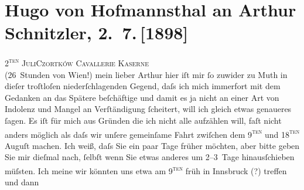 

               \section[Hugo von Hofmannsthal an Arthur Schnitzler, 2. 7. {[}1898{]}]{ Hugo von Hofmannsthal an Arthur Schnitzler, 2. 7. {[}1898{]}}\nopagebreak{}\rehead{ }\begin{ledgroupsized}[t]{13cm}\normalsize\beginnumbering{} \toendnotes[C]{\smallbreak\pagebreak[2]} 
\pstart
           {\pb}\textsc{2\textsuperscript{ten} Juli}\hfill \textsc{Czortków}\pend
           \pstart
           \raggedleft{}\textsc{Cavallerie Kaserne}{\\} (26 Stunden von Wien!)\pend
           \pstart{}mein lieber Arthur\pend\pstart
           hier iſt mir ſo zuwider zu Muth in dieſer troſtloſen niederſchlagenden Gegend,
                    daſs ich mich immerfort mit dem Gedanken an das Spätere beſchäftige und damit es
                    ja nicht an einer Art von Indolenz und Mangel an Verſtändigung ſcheitert, will
                    ich gleich etwas genaueres ſagen. Es iſt {\pb}für mich aus Gründen die ich
                    nicht alle aufzählen will, faſt nicht anders möglich als daſs wir unſere
                    gemeinſame Fahrt zwiſchen dem 9\textsc{\textsuperscript{ten}} und 18\textsc{\textsuperscript{ten}} Auguſt machen. Ich weiß, daſs Sie ein paar Tage früher möchten,
                    aber bitte geben Sie mir dieſmal {\pb}nach, ſelbſt wenn Sie etwas
                    anderes um 2–3 Tage hinausſchieben müſsten. Ich meine wir könnten uns etwa am
                        9\textsc{\textsuperscript{ten}} früh in Innsbruck (?) treffen und dann

\end{ledgroupsized}
